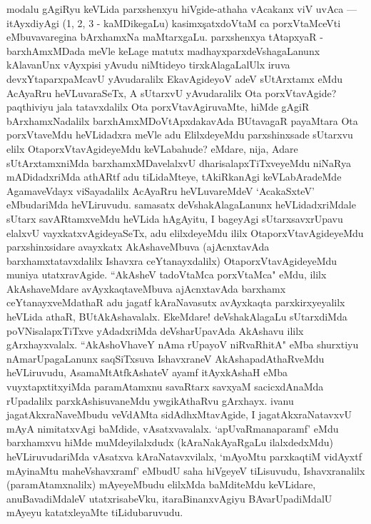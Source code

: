 \begin{artha}
modalu gAgiRyu keVLida parxshenxyu hiVgide-athaha vAcakanx viV uvAca --- itAyxdiyAgi (1, 2, 3 - kaMDikegaLu) kasimx\c satxdoVtaM ca porxVtaMceVti eMbuvavaregina bArxhamxNa maMtarxgaLu. parxshenxya tAtapxyaR - barxhAmxMDada meVle keLage matutx madhayxparxdeVshagaLanunx kAlavanUnx vAyxpisi yAvudu niMtideyo tirxkAlagaLalUlx iruva devxYtaparxpaMcavU yAvudaralilx EkavAgideyoV adeV sUtArxtamx eMdu AcAyaRru heVLuvaraSeTx, A sUtarxvU yAvudaralilx Ota porxVtavAgide? paqthiviyu	jala tatavxdalilx Ota porxVtavAgiruvaMte, hiMde gAgiR bArxhamxNadalilx barxhAmxMDoVtApxdakavAda BUtavagaR payaMtara Ota porxVtaveMdu heVLidadxra meVle adu ElilxdeyeMdu parxshinxsade sUtarxvu elilx OtaporxVtavAgideyeMdu keVLabahude? eMdare, nija, Adare sUtArxtamxniMda barxhamxMDavelalxvU dharisalapxTiTxveyeMdu niNaRya mADidadxriMda athARtf adu tiLidaMteye, tAkiRkanAgi keVLabAradeMde AgamaveVdayx viSayadalilx AcAyaRru heVLuvareMdeV `AcakaSxteV' eMbudariMda heVLiruvudu. samasatx deVshakAlagaLanunx heVLidadxriMdale sUtarx savARtamxveMdu heVLida hAgAyitu, I bageyAgi sUtarxsavxrUpavu elalxvU vayxkatxvAgideyaSeTx, adu elilxdeyeMdu ililx OtaporxVtavAgideyeMdu parxshinxsidare avayxkatx AkAshaveMbuva (ajAcnxtavAda barxhamxtatavxdalilx Ishavxra ceYtanayxdalilx) OtaporxVtavAgideyeMdu muniya utatxravAgide. ``AkAsheV tadoVtaMca porxVtaMca" eMdu, ililx AkAshaveMdare avAyxkaqtaveMbuva ajAcnxtavAda barxhamx ceYtanayxveMdathaR adu jagatf kAraNavasutx avAyxkaqta parxkirxyeyalilx heVLida athaR, BUtAkAshavalalx. EkeMdare! deVshakAlagaLu sUtarxdiMda poVNisalapxTiTxve yAdadxriMda deVsharUpavAda AkAshavu ililx gArxhayxvalalx. ``AkAshoVhaveY nAma rUpayoV niRvaRhitA" eMba shurxtiyu nAmarUpagaLanunx saqSiTxsuva IshavxraneV AkAshapadAthaRveMdu heVLiruvudu, AsamaMtAtfkAshateV ayamf itAyxkAshaH eMba vuyxtapxtitxyiMda paramAtamxnu savaRtarx savxyaM sacicxdAnaMda rUpadalilx parxkAshisuvaneMdu ywgikAthaRvu gArxhayx. ivanu jagatAkxraNaveMbudu  veVdAMta sidAdhxMtavAgide, I jagatAkxraNatavxvU mAyA nimitatxvAgi baMdide, vAsatxvavalalx. `apUvaRmanaparamf' eMdu barxhamxvu hiMde muMdeyilalxdudx (kAraNakAyaRgaLu ilalxdedxMdu) heVLiruvudariMda vAsatxva kAraNatavxvilalx, `mAyoMtu parxkaqtiM vidAyxtf mAyinaMtu maheVshavxramf' eMbudU saha hiVgeyeV tiLisuvudu, Ishavxranalilx (paramAtamxnalilx) mAyeyeMbudu elilxMda baMditeMdu keVLidare, anuBavadiMdaleV utatxrisabeVku, itaraBinanxvAgiyu BAvarUpadiMdalU mAyeyu katatxleyaMte tiLidubaruvudu. 
\end{artha}%

